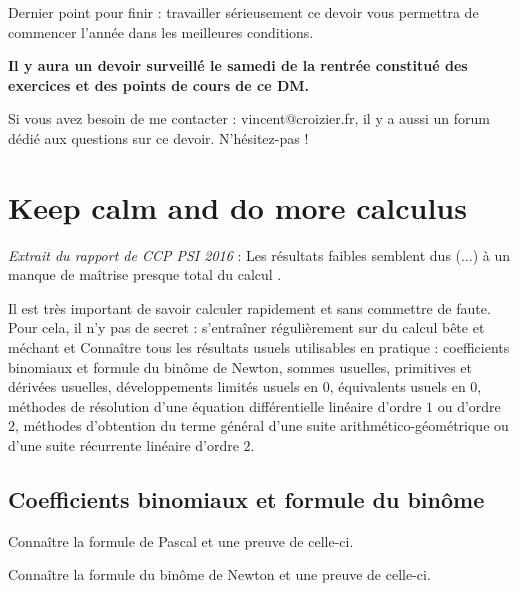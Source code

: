 \documentclass[a4paper,twoside,french,11pt]{VcCours}
\begin{document}
Dernier point pour finir : travailler sérieusement ce devoir vous permettra de 
commencer l'année dans les meilleures conditions. %

\begin{center}
\end{center}

\begin{center}
\textbf{Il y aura un devoir surveillé  le samedi de la rentrée constitué des exercices et des points de cours de ce DM.}
\end{center}

Si vous avez besoin de me contacter : vincent@croizier.fr, il y a aussi un forum
dédié aux questions sur ce devoir. N'hésitez-pas !

\section{Keep calm and do more calculus}

\textit{Extrait du rapport de CCP PSI 2016} : \og Les résultats faibles semblent dus ($\ldots$) à un manque de maîtrise presque total du calcul \fg .

Il est très important de savoir calculer rapidement et sans commettre de faute. Pour cela, il n'y pas de secret : s'entraîner régulièrement sur du calcul \og bête et méchant \fg et Connaître tous les résultats usuels utilisables en pratique : coefficients binomiaux et formule du binôme de Newton, sommes usuelles, primitives et dérivées usuelles, développements limités usuels en $0$, équivalents usuels en $0$, méthodes de résolution d'une équation différentielle linéaire d'ordre $1$ ou d'ordre $2$, méthodes d'obtention du terme général d'une suite arithmético-géométrique  ou d'une suite récurrente linéaire d'ordre $2$.

\subsection{Coefficients binomiaux et formule du binôme}

\begin{ptc}{}
	Connaître la formule de Pascal et une preuve de celle-ci.
\end{ptc}

\begin{ptc}{}
	Connaître la formule du binôme de Newton et une preuve de celle-ci.
\end{ptc}
\end{document}
